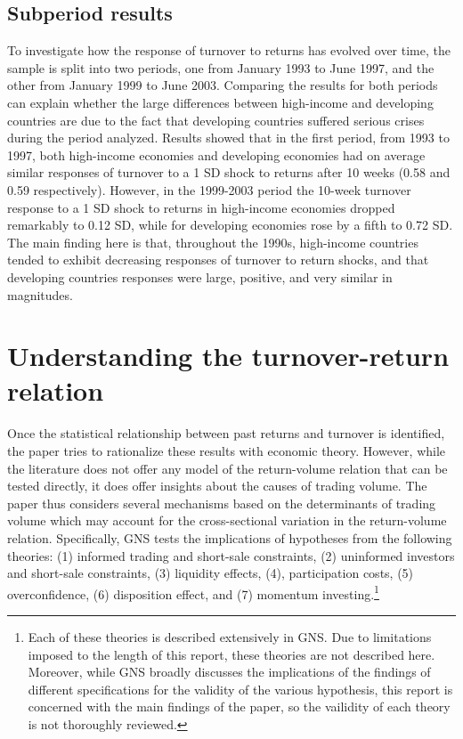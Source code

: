 \documentclass[final,3p,times,twocolumn]{elsarticle}
\begin{document}


\subsection{Subperiod results}


To investigate how the response of turnover to returns has evolved over time, the sample is split into two periods, one from January 1993 to June 1997, and the other from January 1999 to June 2003. Comparing the results for both periods can explain whether the large differences between high-income and developing countries are due to the fact that developing countries suffered serious crises during the period analyzed. Results showed that in the first period, from 1993 to 1997, both high-income economies and developing economies had on average similar responses of turnover to a 1 SD shock to returns after 10 weeks (0.58 and 0.59 respectively). However, in the 1999-2003 period the 10-week turnover response to a 1 SD shock to returns in high-income economies dropped remarkably to 0.12 SD, while for developing economies rose by a fifth to 0.72 SD. The main finding here is that, throughout the 1990s, high-income countries tended to exhibit decreasing responses of turnover to return shocks, and that developing countries responses were large, positive, and very similar in magnitudes.

\section{Understanding the turnover-return relation}

Once the statistical relationship between past returns and turnover is identified, the paper tries to rationalize these results with economic theory. However, while the literature does not offer any model of the return-volume relation that can be tested directly, it does offer insights about the causes of trading volume. The paper thus considers several mechanisms based on the determinants of trading volume which may account for the cross-sectional variation in the return-volume relation. Specifically, GNS tests the implications of hypotheses from the following theories: (1) informed trading and short-sale constraints, (2) uninformed investors and short-sale constraints, (3) liquidity effects, (4), participation costs, (5) overconfidence, (6) disposition effect, and (7) momentum investing.\footnote{Each of these theories is described extensively in GNS. Due to limitations imposed to the length of this report, these theories are not described here. Moreover, while GNS broadly discusses the implications of the findings of different specifications for the validity of the various hypothesis, this report is concerned with the main findings of the paper, so the vailidity of each theory is not thoroughly reviewed.}\par 
\end{document}
